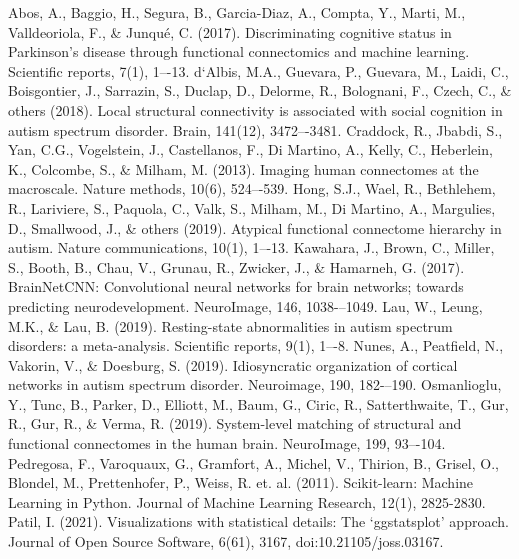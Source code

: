 \documentclass[10pt,conference]{IEEEtran}
\begin{document}

\newpage

\begin{thebibliography}{00}
     {Abos, A., Baggio, H., Segura, B., Garcia-Diaz, A., Compta, Y., Marti, M., Valldeoriola, F., \& Junqué, C. (2017). Discriminating cognitive status in Parkinson’s disease through functional connectomics and machine learning. Scientific reports, 7(1), 1–-13.}
     {d`Albis, M.A., Guevara, P., Guevara, M., Laidi, C., Boisgontier, J., Sarrazin, S., Duclap, D., Delorme, R., Bolognani, F., Czech, C., \& others (2018). Local structural connectivity is associated with social cognition in autism spectrum disorder. Brain, 141(12), 3472–-3481.}
     {Craddock, R., Jbabdi, S., Yan, C.G., Vogelstein, J., Castellanos, F., Di Martino, A., Kelly, C., Heberlein, K., Colcombe, S., \& Milham, M. (2013). Imaging human connectomes at the macroscale. Nature methods, 10(6), 524–-539.}
     {Hong, S.J., Wael, R., Bethlehem, R., Lariviere, S., Paquola, C., Valk, S., Milham, M., Di Martino, A., Margulies, D., Smallwood, J., \& others (2019). Atypical functional connectome hierarchy in autism. Nature communications, 10(1), 1–-13.}
     {Kawahara, J., Brown, C., Miller, S., Booth, B., Chau, V., Grunau, R., Zwicker, J., \& Hamarneh, G. (2017). BrainNetCNN: Convolutional neural networks for brain networks; towards predicting neurodevelopment. NeuroImage, 146, 1038-–1049.}
     {Lau, W., Leung, M.K., \& Lau, B. (2019). Resting-state abnormalities in autism spectrum disorders: a meta-analysis. Scientific reports, 9(1), 1–-8.}
     {Nunes, A., Peatfield, N., Vakorin, V., \& Doesburg, S. (2019). Idiosyncratic organization of cortical networks in autism spectrum disorder. Neuroimage, 190, 182-–190.}
     {Osmanlioglu, Y., Tunc, B., Parker, D., Elliott, M., Baum, G., Ciric, R., Satterthwaite, T., Gur, R., Gur, R., \& Verma, R. (2019). System-level matching of structural and functional connectomes in the human brain. NeuroImage, 199, 93–-104.}
     {Pedregosa, F., Varoquaux, G., Gramfort, A., Michel, V., Thirion, B., Grisel, O., Blondel, M., Prettenhofer, P., Weiss, R. et. al. (2011). Scikit-learn: Machine Learning in Python. Journal of Machine Learning Research, 12(1), 2825-2830.}
     {Patil, I. (2021). Visualizations with statistical details: The `ggstatsplot' approach. Journal of Open Source Software, 6(61), 3167, doi:10.21105/joss.03167.}

\end{thebibliography}
\end{document}
